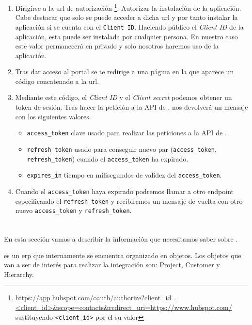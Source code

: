 \begin{enumerate}
	\item Dirigirse a la url de autorización \footnote{\url{https://app.hubspot.com/oauth/authorize?client_id=<client_id>&scope=contacts&redirect_uri=https://www.hubspot.com/} sustituyendo \texttt{<client\_id>} por el su valor}.
	Autorizar la instalación de la aplicación. Cabe destacar que solo se puede acceder a dicha url y por tanto instalar la aplicación si se cuenta con el \verb|Client ID|.
		Haciendo público el \textit{Client ID} de la aplicación, esta puede ser instalada por cualquier persona. En nuestro caso este valor permanecerá en privado y solo nosotros haremos uso de la aplicación.
		
	\item Tras dar acceso al portal se te redirige a una página en la que aparece un código concatenado a la url.
	\item Mediante este código, el \textit{Client ID} y el \textit{Client secret} podemos obtener un token de sesión.
	Tras hacer la petición a la API de \hs{}, nos devolverá un mensaje con los siguientes valores.
		\begin{itemize}
			\item \texttt{access\_token} clave usado para realizar las peticiones a la API de \hs.
			\item \texttt{refresh\_token} usado para conseguir nuevo par (\texttt{access\_token}, \texttt{refresh\_token}) cuando el \texttt{access\_token} ha expirado.
			\item \texttt{expires\_in} tiempo en milisegundos de validez del \texttt{access\_token}.
		\end{itemize}
	\item Cuando el \texttt{access\_token} haya expirado podremos llamar a otro endpoint especificando el \texttt{refresh\_token} y recibiremos un mensaje de vuelta con otro nuevo \texttt{access\_token} y \texttt{refresh\_token}.
\end{enumerate}



\section{\wday{}}

En esta sección vamos a describir la información que necesitamos saber sobre \wday.

\wday{} es un \acrshort{erp} que internamente se encuentra organizado en objetos. Los objetos que van a ser de interés para realizar la integración son:
Project, Customer y Hierarchy.

